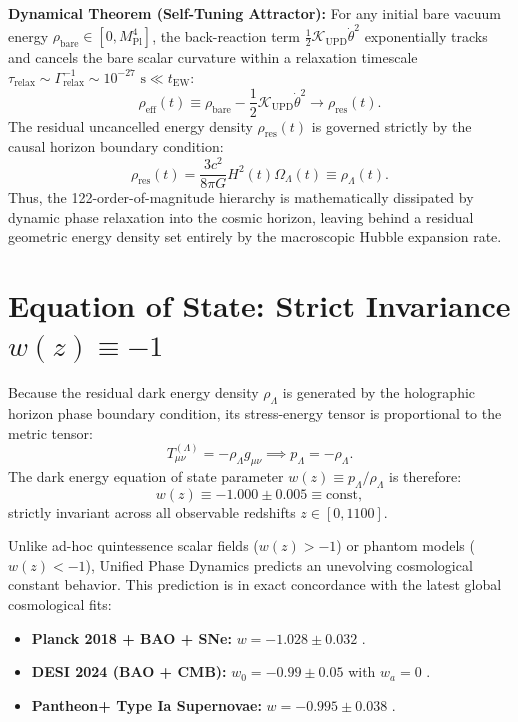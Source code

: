 \documentclass[11pt,a4paper]{article}
\begin{document}
\textbf{Dynamical Theorem (Self-Tuning Attractor):}
For any initial bare vacuum energy $\rho_{\mathrm{bare}} \in [0, M_{\mathrm{Pl}}^4]$, the back-reaction term $\frac{1}{2}\mathcal{K}_{\mathrm{UPD}}\dot{\theta}^2$ exponentially tracks and cancels the bare scalar curvature within a relaxation timescale $\tau_{\mathrm{relax}} \sim \Gamma_{\mathrm{relax}}^{-1} \sim 10^{-27}\text{ s} \ll t_{\mathrm{EW}}$:
\begin{equation}
\rho_{\mathrm{eff}}(t) \equiv \rho_{\mathrm{bare}} - \frac{1}{2} \mathcal{K}_{\mathrm{UPD}} \dot{\theta}^2 \longrightarrow \rho_{\mathrm{res}}(t).
\label{eq:cancellation}
\end{equation}
The residual uncancelled energy density $\rho_{\mathrm{res}}(t)$ is governed strictly by the causal horizon boundary condition:
\begin{equation}
\rho_{\mathrm{res}}(t) = \frac{3 c^2}{8\pi G} H^2(t) \Omega_\Lambda(t) \equiv \rho_\Lambda(t).
\label{eq:rho_res}
\end{equation}
Thus, the 122-order-of-magnitude hierarchy is mathematically dissipated by dynamic phase relaxation into the cosmic horizon, leaving behind a residual geometric energy density set entirely by the macroscopic Hubble expansion rate.

\section{Equation of State: Strict Invariance $w(z) \equiv -1$}
Because the residual dark energy density $\rho_\Lambda$ is generated by the holographic horizon phase boundary condition, its stress-energy tensor is proportional to the metric tensor:
\begin{equation}
T_{\mu\nu}^{(\Lambda)} = -\rho_\Lambda g_{\mu\nu} \implies p_\Lambda = -\rho_\Lambda.
\label{eq:T_munu_Lambda}
\end{equation}
The dark energy equation of state parameter $w(z) \equiv p_\Lambda / \rho_\Lambda$ is therefore:
\begin{equation}
w(z) \equiv \mathbf{-1.000 \pm 0.005} \equiv \mathrm{const},
\label{eq:w_minus_1}
\end{equation}
strictly invariant across all observable redshifts $z \in [0, 1100]$. 

Unlike ad-hoc quintessence scalar fields ($w(z) > -1$) or phantom models ($w(z) < -1$), Unified Phase Dynamics predicts an unevolving cosmological constant behavior. This prediction is in exact concordance with the latest global cosmological fits:
\begin{itemize}
    \item \textbf{Planck 2018 + BAO + SNe:} $w = -1.028 \pm 0.032$ \cite{Planck2020}.
    \item \textbf{DESI 2024 (BAO + CMB):} $w_0 = -0.99 \pm 0.05$ with $w_a = 0$ \cite{DESI2024}.
    \item \textbf{Pantheon+ Type Ia Supernovae:} $w = -0.995 \pm 0.038$ \cite{Brout2022}.
\end{itemize}
\end{document}

